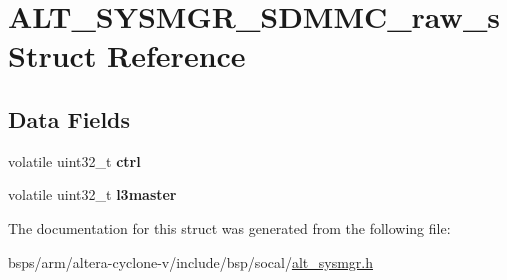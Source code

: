 \hypertarget{structALT__SYSMGR__SDMMC__raw__s}{}\section{A\+L\+T\+\_\+\+S\+Y\+S\+M\+G\+R\+\_\+\+S\+D\+M\+M\+C\+\_\+raw\+\_\+s Struct Reference}
\label{structALT__SYSMGR__SDMMC__raw__s}
\subsection*{Data Fields}
\begin{DoxyCompactItemize}
\item 
\mbox{\label{structALT__SYSMGR__SDMMC__raw__s_aa0f42449d77069670b70d1a2b14858c5}} 
volatile uint32\+\_\+t {\bfseries ctrl}
\item 
\mbox{\label{structALT__SYSMGR__SDMMC__raw__s_aa395a93d9a95163d60857a5f746a4d20}} 
volatile uint32\+\_\+t {\bfseries l3master}
\end{DoxyCompactItemize}


The documentation for this struct was generated from the following file\+:\begin{DoxyCompactItemize}
\item 
bsps/arm/altera-\/cyclone-\/v/include/bsp/socal/\mbox{\hyperlink{alt__sysmgr_8h}{alt\+\_\+sysmgr.\+h}}\end{DoxyCompactItemize}
